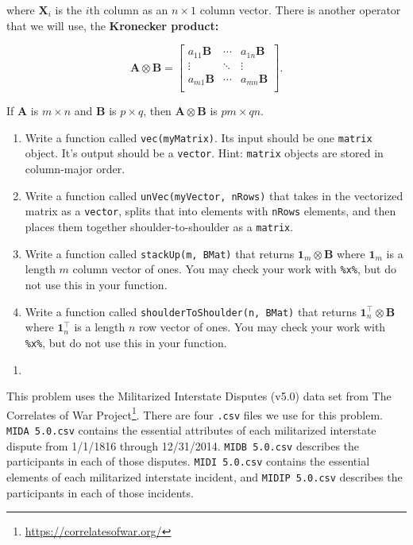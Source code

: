 \documentclass[12pt,krantz2]{krantz}
\providecommand{\tightlist}{%
  \setlength{\itemsep}{0pt}\setlength{\parskip}{0pt}}
\renewcommand{\href}[2]{#2\footnote{\url{#1}}}
\begin{document}
where \(\mathbf{X}_i\) is the \(i\)th column as an \(n \times 1\) column vector. There is another operator that we will use, the \textbf{Kronecker product:}

\begin{equation} 
\mathbf{A} \otimes \mathbf{B} = 
\begin{bmatrix}
a_{11} \mathbf{B} & \cdots & a_{1n} \mathbf{B} \\
\vdots & \ddots & \vdots \\
a_{m1} \mathbf{B} & \cdots & a_{mn} \mathbf{B} \\
\end{bmatrix}.
\end{equation}

If \(\mathbf{A}\) is \(m \times n\) and \(\mathbf{B}\) is \(p \times q\), then \(\mathbf{A} \otimes \mathbf{B}\) is \(pm \times qn\).

\begin{enumerate}
\def\labelenumi{\alph{enumi})}
\tightlist
\item
  Write a function called \texttt{vec(myMatrix)}. Its input should be one \texttt{matrix} object. It's output should be a \texttt{vector}. Hint: \texttt{matrix} objects are stored in column-major order.
\item
  Write a function called \texttt{unVec(myVector,\ nRows)} that takes in the vectorized matrix as a \texttt{vector}, splits that into elements with \texttt{nRows} elements, and then places them together shoulder-to-shoulder as a \texttt{matrix}.
\item
  Write a function called \texttt{stackUp(m,\ BMat)} that returns \(\mathbf{1}_m \otimes \mathbf{B}\) where \(\mathbf{1}_m\) is a length \(m\) column vector of ones. You may check your work with \texttt{\%x\%}, but do not use this in your function.
\item
  Write a function called \texttt{shoulderToShoulder(n,\ BMat)} that returns \(\mathbf{1}^\intercal_n \otimes \mathbf{B}\) where \(\mathbf{1}_n^\intercal\) is a length \(n\) row vector of ones. You may check your work with \texttt{\%x\%}, but do not use this in your function.
\end{enumerate}

\begin{enumerate}
\def\labelenumi{\arabic{enumi}.}
\setcounter{enumi}{3}
\item
\end{enumerate}

This problem uses the Militarized Interstate Disputes (v5.0) \citep{mid5} data set from \href{https://correlatesofwar.org/}{The Correlates of War Project}. There are four \texttt{.csv} files we use for this problem. \texttt{MIDA\ 5.0.csv} contains the essential attributes of each militarized interstate dispute from 1/1/1816 through 12/31/2014. \texttt{MIDB\ 5.0.csv} describes the participants in each of those disputes. \texttt{MIDI\ 5.0.csv} contains the essential elements of each militarized interstate incident, and \texttt{MIDIP\ 5.0.csv} describes the participants in each of those incidents.
\end{document}
